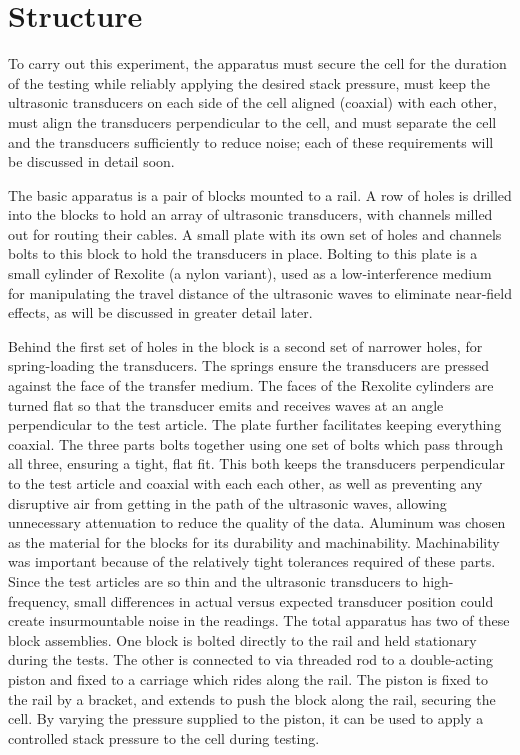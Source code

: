 
\section{Structure}
To carry out this experiment, the apparatus must secure the cell for the duration of the testing while reliably applying the desired stack pressure, must keep the ultrasonic transducers on each side of the cell aligned (coaxial) with each other, must align the transducers perpendicular to the cell, and must separate the cell and the transducers sufficiently to reduce noise; each of these requirements will be discussed in detail soon.

The basic apparatus is a pair of blocks mounted to a rail. A row of holes is drilled into the blocks to hold an array of ultrasonic transducers, with channels milled out for routing their cables. A small plate with its own set of holes and channels bolts to this block to hold the transducers in place. Bolting to this plate is a small cylinder of Rexolite (a nylon variant), used as a low-interference medium for manipulating the travel distance of the ultrasonic waves to eliminate near-field effects, as will be discussed in greater detail later.

Behind the first set of holes in the block is a second set of narrower holes, for spring-loading the transducers. The springs ensure the transducers are pressed against the face of the transfer medium. The faces of the Rexolite cylinders are turned flat so that the transducer emits and receives waves at an angle perpendicular to the test article. The plate further facilitates keeping everything coaxial. The three parts bolts together using one set of bolts which pass through all three, ensuring a tight, flat fit. This both keeps the transducers perpendicular to the test article and coaxial with each each other, as well as preventing any disruptive air from getting in the path of the ultrasonic waves, allowing unnecessary attenuation to reduce the quality of the data. Aluminum was chosen as the material for the blocks for its durability and machinability. Machinability was important because of the relatively tight tolerances required of these parts. Since the test articles are so thin and the ultrasonic transducers to high-frequency, small differences in actual versus expected transducer position could create insurmountable noise in the readings. The total apparatus has two of these block assemblies. One block is bolted directly to the rail and held stationary during the tests. The other is connected to via threaded rod to a double-acting piston and fixed to a carriage which rides along the rail. The piston is fixed to the rail by a bracket, and extends to push the block along the rail, securing the cell. By varying the pressure supplied to the piston, it can be used to apply a controlled stack pressure to the cell during testing.

